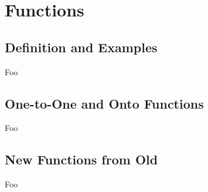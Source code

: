 \section{Functions}

\subsection{Definition and Examples}

Foo

\subsection{One-to-One and Onto Functions}

Foo

\subsection{New Functions from Old}

Foo

